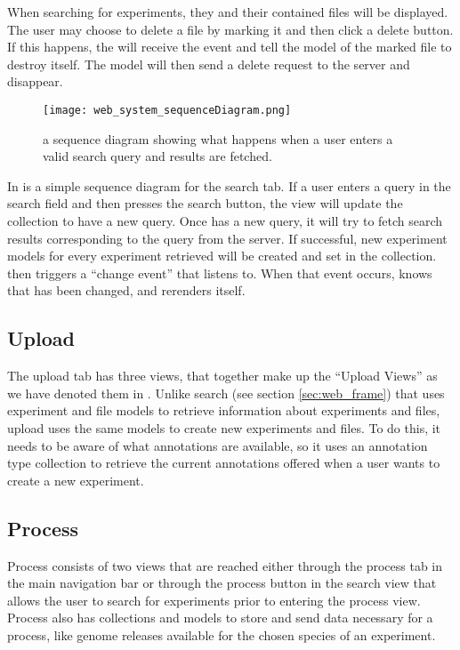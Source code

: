 \begin{example}
When searching for experiments, they and their contained files will be displayed. The user may choose to delete a file by marking it and then click a delete button. If this happens, the  will receive the event and tell the model of the marked file to destroy itself. The model will then send a delete request to the server and disappear.
\end{example}

 
\begin{figure}[h]
\centering
\texttt{[image: web\_system\_sequenceDiagram.png]}
\caption{\label{fig:web_system_sequenceDiagram}a sequence diagram showing what happens when a user enters a valid search query and results are fetched.}
\end{figure}

In  is a simple sequence diagram for the search tab. If a user enters a query in the search field and then presses the search button, the  view will update the  collection to have a new query. Once  has a new query, it will try to fetch search results corresponding to the query from the server. If successful, new experiment models for every experiment retrieved will be created and set in the  collection.  then triggers a ``change event'' that  listens to. When that event occurs,  knows that  has been changed, and rerenders itself.

\subsection{Upload}
The upload tab has three views, that together make up the ``Upload Views'' as we have denoted them in . Unlike search (see section \ref{sec:web_frame}) that uses experiment and file models to retrieve information about experiments and files, upload uses the same models to create new experiments and files. To do this, it needs to be aware of what annotations are available, so it uses an annotation type collection to retrieve the current annotations offered when a user wants to create a new experiment.

\subsection{Process} 
Process consists of two views that are reached either through the process
tab in the main navigation bar or through the process button in the search view
that allows the user to search for experiments prior to entering the process
view. Process also has collections and models to store and send data necessary 
for a process, like genome releases available for the chosen species of an 
experiment.

